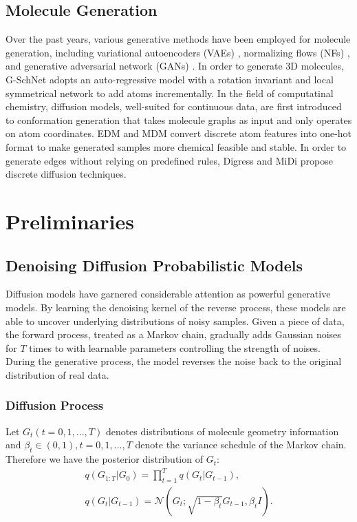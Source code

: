 \documentclass[letterpaper]{article} %
\begin{document}
\subsection{Molecule Generation}
Over the past years, various generative methods have been employed for molecule generation, including variational autoencoders (VAEs) \cite{vae_13_kingma}, normalizing flows (NFs) \cite{nice_15_dinh}, and generative adversarial network (GANs) \cite{gan_14_goodfellow}. In order to generate 3D molecules, G-SchNet \cite{gschnet_19_wallach} adopts an auto-regressive model with a rotation invariant and local symmetrical network to add atoms incrementally.
In the field of computatinal chemistry, diffusion models, well-suited for continuous data, are first introduced to conformation generation that takes molecule graphs as input and only operates on atom coordinates.
EDM \cite{edm_22_hoogeboom} and MDM \cite{mdm_23_huang} convert discrete atom features into one-hot format to make generated samples more chemical feasible and stable. In order to generate edges without relying on predefined rules, Digress \cite{digress_22_vignac} and MiDi \cite{midi_23_vignac} propose discrete diffusion techniques.





\section{Preliminaries}
\subsection{Denoising Diffusion Probabilistic Models}
Diffusion models have garnered considerable attention as powerful generative models. By learning the denoising kernel of the reverse process, these models are able to uncover underlying distributions of noisy samples. Given a piece of data, the forward process, treated as a Markov chain, gradually adds Gaussian noises for $T$ times to with learnable parameters controlling the strength of noises. During the generative process, the model reverses the noise back to the original distribution of real data.

\subsubsection{Diffusion Process}
Let $G_t (t=0, 1, ..., T)$ denotes distributions of molecule geometry information and $\beta_t \in (0, 1), t=0, 1, ..., T$ denote the variance schedule of the Markov chain. Therefore we have the posterior distribution of $G_t$:
\begin{eqnarray}
&q(G_{1:T} | G_0) = \prod^T_{t=1} q(G_t | G_{t-1}), &\\
&q(G_t | G_{t-1}) = \mathcal{N}(G_t; \sqrt{1-\beta_t}G_{t-1}, \beta_t I).&
\end{eqnarray}
\end{document}
